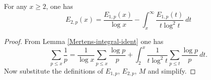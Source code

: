 \begin{corollary}
\label{Mertens-second-error-prime-eq}
\leanok
For any $x \geq 2$, one has
$$ E_{2,p}(x) = \frac{E_{1,p}(x)}{\log x} - \int_x^\infty \frac{E_{1,p}(t)}{t \log^2 t}\ dt$$
\end{corollary}
\begin{proof}
\leanok
From Lemma \ref{Mertens-integral-ident} one has
$$ \sum_{p \leq x} \frac{1}{p} = \frac{1}{\log x} \sum_{p \leq x} \frac{\log p}{p} + \int_2^x \frac{1}{t \log^2 t} \sum_{p \leq t} \frac{\log p}{p} \, dt.$$
Now substitute the definitions of $E_{1,p}$, $E_{2,p}$, $M$ and simplify.
\end{proof}
